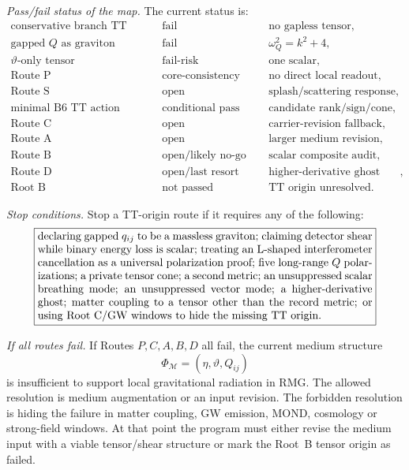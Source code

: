 \documentclass[11pt]{article}
\begin{document}
\medskip\noindent\textit{Pass/fail status of the map.}
The current status is:
\[
\boxed{
\begin{array}{lll}
\text{conservative branch TT origin} & \text{fail} & \text{no gapless tensor},\\
\text{gapped }Q\text{ as graviton} & \text{fail} & \omega_Q^2=k^2+4,\\
\vartheta\text{-only tensor} & \text{fail-risk} & \text{one scalar},\\
\text{Route P} & \text{core-consistency pass} & \text{no direct local readout},\\
\text{Route S} & \text{open} & \text{splash/scattering response},\\
\text{minimal B6 TT action} & \text{conditional pass} & \text{candidate rank/sign/cone},\\
\text{Route C} & \text{open} & \text{carrier-revision fallback},\\
\text{Route A} & \text{open} & \text{larger medium revision},\\
\text{Route B} & \text{open/likely no-go} & \text{scalar composite audit},\\
\text{Route D} & \text{open/last resort} & \text{higher-derivative ghost risk},\\
\text{Root B} & \text{not passed} & \text{TT origin unresolved}.
\end{array}}
\]

\medskip\noindent\textit{Stop conditions.}
Stop a TT-origin route if it requires any of the following:
\[
\boxed{
\begin{minipage}{0.88\linewidth}
declaring gapped \(q_{ij}\) to be a massless graviton; claiming detector
shear while binary energy loss is scalar; treating an L-shaped interferometer
cancellation as a universal polarization proof; five long-range \(Q\)
polarizations; a private tensor cone; a second metric; an unsuppressed scalar
breathing mode; an unsuppressed vector mode; a higher-derivative ghost; matter
coupling to a tensor other than the record metric; or using Root~C/GW windows
to hide the missing TT origin.
\end{minipage}}
\]

\medskip\noindent\textit{If all routes fail.}
If Routes \(P,C,A,B,D\) all fail, the current medium structure
\[
\boxed{\Phi_{\mathcal M}=(\eta,\vartheta,Q_{ij})}
\]
is insufficient to support local gravitational radiation in RMG.  The allowed
resolution is medium augmentation or an input revision.  The forbidden
resolution is hiding the failure in matter coupling, GW emission, MOND,
cosmology or strong-field windows.  At that point the program must either
revise the medium input with a viable tensor/shear structure or mark the
Root~B tensor origin as failed.
\end{document}
